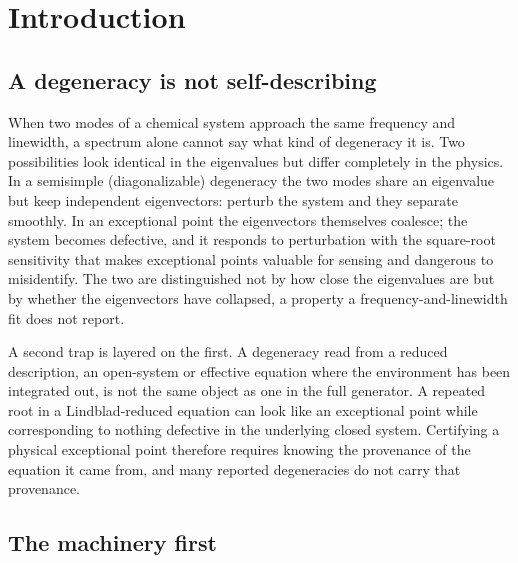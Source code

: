 \section{Introduction}

\subsection{A degeneracy is not self-describing}

When two modes of a chemical system approach the same frequency and linewidth, a spectrum alone cannot say what kind of degeneracy it is. Two possibilities look identical in the eigenvalues but differ completely in the physics. In a semisimple (diagonalizable) degeneracy the two modes share an eigenvalue but keep independent eigenvectors: perturb the system and they separate smoothly. In an exceptional point the eigenvectors themselves coalesce; the system becomes defective, and it responds to perturbation with the square-root sensitivity that makes exceptional points valuable for sensing and dangerous to misidentify. The two are distinguished not by how close the eigenvalues are but by whether the eigenvectors have collapsed, a property a frequency-and-linewidth fit does not report.

A second trap is layered on the first. A degeneracy read from a reduced description, an open-system or effective equation where the environment has been integrated out, is not the same object as one in the full generator. A repeated root in a Lindblad-reduced equation can look like an exceptional point while corresponding to nothing defective in the underlying closed system. Certifying a physical exceptional point therefore requires knowing the provenance of the equation it came from, and many reported degeneracies do not carry that provenance.

\subsection{The machinery first}

